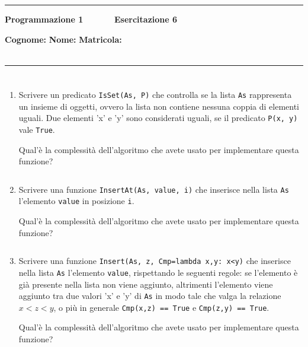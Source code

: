 \documentclass[11pt,a4]{article}
\newcommand{\mybox}[2]{$\quad$\fbox{
\begin{minipage}{#1cm}
\hfill\vspace{#2cm}
\end{minipage}
}}
\begin{document}
\thispagestyle{empty}
\hrule
\begin{center}
   {\Large {\bf Programmazione 1 \hspace{3cm} $\quad \quad \quad$ Esercitazione 6}}
\end{center}
{\bf Cognome: }\hspace{2.5cm} {\bf Nome: } \hspace{2.5cm} {\bf Matricola: } \\\
\hrule

\section*{}

\begin{enumerate}

\item Scrivere un predicato {\tt IsSet(As, P)} che controlla se la lista {\tt As} rappresenta
un insieme di oggetti, ovvero la lista non contiene nessuna coppia di elementi uguali. Due elementi 'x' e 'y'
sono considerati uguali, se il predicato {\tt P(x, y)} vale {\tt True}.

Qual'è la complessità dell'algoritmo che avete usato per implementare questa funzione?

\mybox{15}{2.75}

\item Scrivere una funzione {\tt InsertAt(As, value, i)} che inserisce nella lista {\tt As} l'elemento {\tt value}
in posizione {\tt i}.

Qual'è la complessità dell'algoritmo che avete usato per implementare questa funzione?

\mybox{15}{2.75}

\item Scrivere una funzione {\tt Insert(As, z, Cmp=lambda x,y: x<y)} che inserisce nella lista {\tt As} l'elemento {\tt value},
rispettando le seguenti regole: se l'elemento è già presente nella lista non viene aggiunto,
altrimenti l'elemento viene aggiunto tra due valori 'x' e 'y' di {\tt As} in modo tale che 
valga la relazione $x < z < y$, o più in generale {\tt Cmp(x,z) == True} e {\tt Cmp(z,y) == True}.

Qual'è la complessità dell'algoritmo che avete usato per implementare questa funzione?


\end{enumerate}
\end{document}

